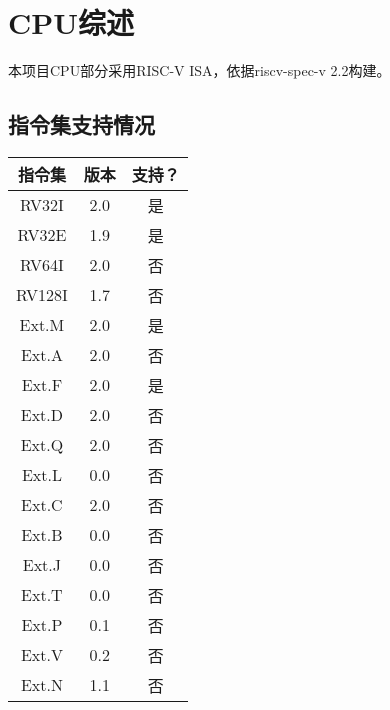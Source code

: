 %
%
%
%
%
%
%
%

\chapter{CPU综述}
本项目CPU部分采用RISC-V ISA，依据riscv-spec-v 2.2构建。
\section{指令集支持情况}
\begin{tabular}{|c|c|c|}
    \hline
    指令集  &   版本    &   支持？\\\hline
    RV32I   &   2.0 &   是\\\hline
    RV32E   &   1.9 &   是\\\hline
    RV64I   &   2.0 &   否\\\hline
    RV128I  &   1.7 &   否\\\hline
    Ext.M   &   2.0 &   是\\\hline
    Ext.A   &   2.0 &   否\\\hline
    Ext.F   &   2.0 &   是\\\hline
    Ext.D   &   2.0 &   否\\\hline
    Ext.Q   &   2.0 &   否\\\hline
    Ext.L   &   0.0 &   否\\\hline
    Ext.C   &   2.0 &   否\\\hline
    Ext.B   &   0.0 &   否\\\hline
    Ext.J   &   0.0 &   否\\\hline
    Ext.T   &   0.0 &   否\\\hline
    Ext.P   &   0.1 &   否\\\hline
    Ext.V   &   0.2 &   否\\\hline
    Ext.N   &   1.1 &   否\\\hline
\end{tabular}
